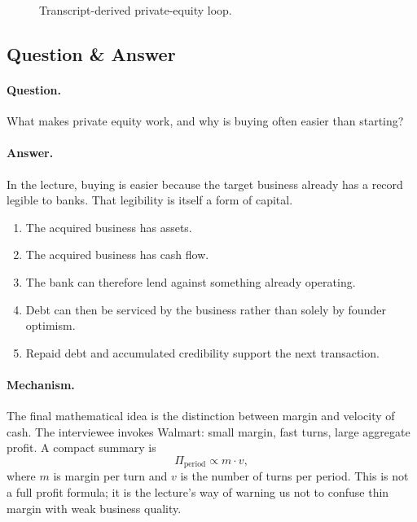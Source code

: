 \begin{figure}[h]
\centering
{}
\caption{Transcript-derived private-equity loop.}
\end{figure}

\subsection{Question \& Answer}

\paragraph{Question.} What makes private equity work, and why is buying often easier than starting?

\paragraph{Answer.} In the lecture, buying is easier because the target business already has a record legible to banks. That legibility is itself a form of capital.

\begin{enumerate}
\item The acquired business has assets.
\item The acquired business has cash flow.
\item The bank can therefore lend against something already operating.
\item Debt can then be serviced by the business rather than solely by founder optimism.
\item Repaid debt and accumulated credibility support the next transaction.
\end{enumerate}

\paragraph{Mechanism.} The final mathematical idea is the distinction between margin and velocity of cash. The interviewee invokes Walmart: small margin, fast turns, large aggregate profit. A compact summary is
\begin{equation}
\Pi_{\mathrm{period}} \propto m\cdot v,
\end{equation}
where \(m\) is margin per turn and \(v\) is the number of turns per period. This is not a full profit formula; it is the lecture's way of warning us not to confuse thin margin with weak business quality.

